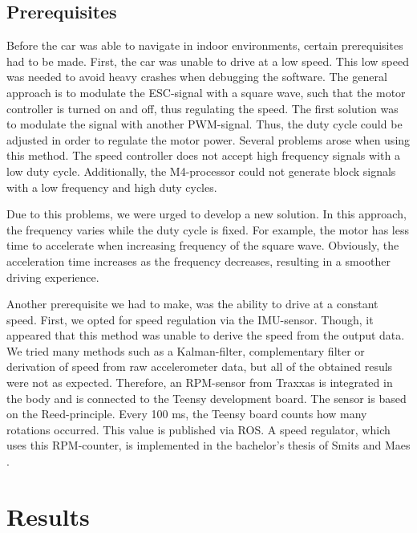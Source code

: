 \documentclass[conference,a4paper]{IEEEtran}
\begin{document}
\subsection{Prerequisites}
Before the car was able to navigate in indoor environments, certain prerequisites had to be made. First, the car was unable to drive at a low speed. This low speed was needed to avoid heavy crashes when debugging the software. The general approach is to modulate the ESC-signal with a square wave, such that the motor controller is turned on and off, thus regulating the speed. The first solution was to modulate the signal with another PWM-signal. Thus, the duty cycle could be adjusted in order to regulate the motor power. Several problems arose when using this method. The speed controller does not accept high frequency signals with a low duty cycle. Additionally, the M4-processor could not generate block signals with a low frequency and high duty cycles.

Due to this problems, we were urged to develop a new solution. In this approach, the frequency varies while the duty cycle is fixed. For example, the motor has less time to accelerate when increasing frequency of the square wave. Obviously, the acceleration time increases as the frequency decreases, resulting in a smoother driving experience.

Another prerequisite we had to make, was the ability to drive at a constant speed. First, we opted for speed regulation via the IMU-sensor. Though, it appeared that this method was unable to derive the speed from the output data. We tried many methods such as a Kalman-filter, complementary filter or derivation of speed from raw accelerometer data, but all of the obtained resuls were not as expected. Therefore, an RPM-sensor from Traxxas is integrated in the body and is connected to the Teensy development board. The sensor is based on the Reed-principle. Every 100 ms, the Teensy board counts how many rotations occurred. This value is published via ROS. A speed regulator, which uses this RPM-counter, is implemented in the bachelor's thesis of Smits and Maes \cite{SmitsMaes2017}.

\section{Results}
\label{sec:Results}
\end{document}

